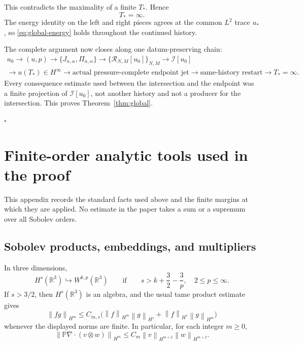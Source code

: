 \documentclass[11pt,letterpaper]{article}
\theoremstyle{definition}
\theoremstyle{remark}
\newcommand{\R}{\mathbb R}
\newcommand{\cR}{\mathcal R}
\newcommand{\cI}{\mathcal I}
\newcommand{\norm}[1]{\left\lVert #1\right\rVert}
\begin{document}
This contradicts the maximality of a finite \(T_*\).  Hence
\begin{equation}
\boxed{T_*=\infty.}
\label{eq:global-time}
\end{equation}
The energy identity on the left and right pieces agrees at the common
\(L^2\) trace \(u_*\), so \eqref{eq:global-energy} holds throughout the
continued history.

The complete argument now closes along one datum-preserving chain:
\begin{equation}
\boxed{\begin{gathered}
u_0\longrightarrow(u,p)
\longrightarrow\{J_{n,\alpha},\Pi_{n,\alpha}\}
\longrightarrow\{\cR_{N,M}[u_0]\}_{N,M}
\longrightarrow\cI[u_0]\\
\longrightarrow u(T_*)\in H^\infty
\longrightarrow\text{actual pressure-complete endpoint jet}
\longrightarrow\text{same-history restart}
\longrightarrow T_*=\infty.
\end{gathered}}
\label{eq:closing-chain}
\end{equation}
Every consequence estimate used between the intersection and the endpoint
was a finite projection of \(\cI[u_0]\), not another history and not a
producer for the intersection.  This proves Theorem~\ref{thm:global}.

\hfill\(\square\)

\appendix

\section{Finite-order analytic tools used in the proof}

This appendix records the standard facts used above and the finite margins
at which they are applied.  No estimate in the paper takes a sum or a
supremum over all Sobolev orders.

\subsection{Sobolev products, embeddings, and multipliers}

In three dimensions,
\begin{equation}
H^s(\R^3)\hookrightarrow W^{k,p}(\R^3)
\qquad\text{if}\qquad
s>k+\frac32-\frac3p,
\quad 2\le p\le\infty.
\label{eq:appendix-sobolev-embedding}
\end{equation}
If \(s>3/2\), then \(H^s(\R^3)\) is an algebra, and the usual tame product
estimate gives
\[
\norm{fg}_{H^m}
\le C_{m,s}\bigl(
\norm{f}_{H^m}\norm{g}_{H^s}
+\norm{f}_{H^s}\norm{g}_{H^m}
\bigr)
\]
whenever the displayed norms are finite.  In particular, for each integer
\(m\ge0\),
\begin{equation}
\norm{\mathbb P\nabla\cdot(v\otimes w)}_{H^m}
\le C_m\norm{v}_{H^{m+2}}\norm{w}_{H^{m+2}}.
\label{eq:appendix-product}
\end{equation}
\end{document}
